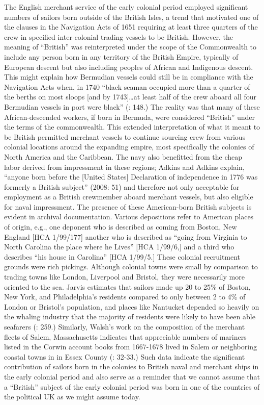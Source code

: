 The English merchant service of the early colonial period employed significant numbers of sailors born outside of the British Isles, a trend that motivated one of the clauses in the Navigation Acts of 1651 requiring at least three quarters of the crew in specified inter-colonial trading vessels to be British. However, the meaning of “British” was reinterpreted under the scope of the Commonwealth to include any person born in any territory of the British Empire, typically of European descent but also including peoples of African and Indigenous descent. This might explain how Bermudian vessels could still be in compliance with the Navigation Acts when, in 1740 “black seaman occupied more than a quarter of the berths on most sloops [and by 1743]…at least half of the crew aboard all four Bermudian vessels in port were black” (\citealt{Jarvis2010}: 148.) The reality was that many of these African-descended workers, if born in Bermuda, were considered “British” under the terms of the commonwealth. This extended interpretation of what it meant to be British permitted merchant vessels to continue sourcing crew from various colonial locations around the expanding empire, most specifically the colonies of North America and the Caribbean. The navy also benefitted from the cheap labor derived from impressment in these regions; Adkins and Adkins explain, “anyone born before the [United States] Declaration of independence in 1776 was formerly a British subject” (2008: 51) and therefore not only acceptable for employment as a British crewmember aboard merchant vessels, but also eligible for naval impressment. The presence of these American-born British subjects is evident in archival documentation. Various depositions refer to American places of origin, e.g., one deponent who is described as coming from Boston, New England [HCA 1/99/177] another who is described as “going from Virginia to North Carolina the place where he Lives” [HCA 1/99/6,] and a third who describes “his house in Carolina” [HCA 1/99/5.] These colonial recruitment grounds were rich pickings. Although colonial towns were small by comparison to trading towns like London, Liverpool and Bristol, they were necessarily more oriented to the sea. Jarvis estimates that sailors made up 20 to 25\% of Boston, New York, and Philadelphia’s residents compared to only between 2 to 4\% of London or Bristol’s population, and places like Nantucket depended so heavily on the whaling industry that the majority of residents were likely to have been able seafarers (\citealt{Jarvis2010}: 259.) Similarly, Walsh’s work on the composition of the merchant fleets of Salem, Massachusetts indicates that appreciable numbers of mariners listed in the Corwin account books from 1667-1678 lived in Salem or neighboring coastal towns in in Essex County (\citealt{Walsh1994}: 32-33.) Such data indicate the significant contribution of sailors born in the colonies to British naval and merchant ships in the early colonial period and also serve as a reminder that we cannot assume that a “British” subject of the early colonial period was born in one of the countries of the political UK as we might assume today. 

